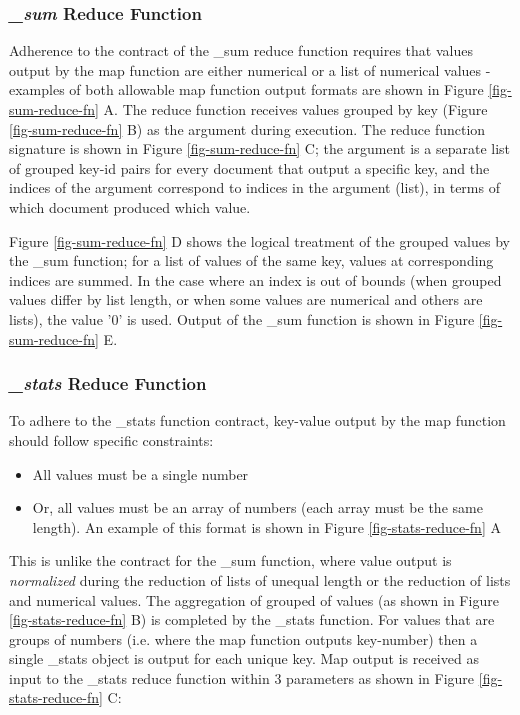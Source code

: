 \subsubsection{\textit{\_sum} Reduce Function}
Adherence to the contract of the \_sum reduce function requires that values output by the map function are either numerical or a list of numerical values - examples of both allowable map function output formats are shown in Figure \ref{fig-sum-reduce-fn} A. The reduce function receives values grouped by key (Figure \ref{fig-sum-reduce-fn} B) as the  argument during execution. The reduce function signature is shown in Figure \ref{fig-sum-reduce-fn} C; the  argument is a separate list of grouped key-id pairs for every document that output a specific key, and the indices of the  argument correspond to indices in the  argument (list), in terms of which document produced which value.

Figure \ref{fig-sum-reduce-fn} D shows the logical treatment of the grouped values by the \_sum function; for a list of values of the same key, values at corresponding indices are summed. In the case where an index is out of bounds (when grouped values differ by list length, or when some values are numerical and others are lists), the value '0' is used. Output of the \_sum function is shown in Figure \ref{fig-sum-reduce-fn} E.



\subsubsection{\textit{\_stats} Reduce Function}
To adhere to the \_stats function contract, key-value output by the map function should follow specific constraints:

\begin{itemize}
    \item All values must be a single number
    \item Or, all values must be an array of numbers (each array must be the same length). An example of this format is shown in Figure \ref{fig-stats-reduce-fn} A
\end{itemize}

This is unlike the contract for the \_sum function, where value output is \textit{normalized} during the reduction of lists of unequal length or the reduction of lists and numerical values. The aggregation of grouped of values (as shown in Figure \ref{fig-stats-reduce-fn} B) is completed by the \_stats function. For values that are groups of numbers (i.e. where the map function outputs key-number) then a single \_stats object is output for each unique key. Map output is received as input to the \_stats reduce function within 3 parameters as shown in Figure \ref{fig-stats-reduce-fn} C:

